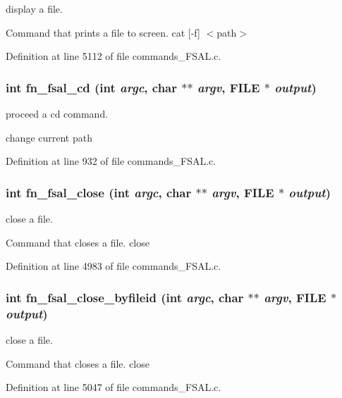 display a file.

Command that prints a file to screen. cat [-f] $<$path$>$ 

Definition at line 5112 of file commands\_\-FSAL.c.
\subsubsection[{fn\_\-fsal\_\-cd}]{\setlength{\rightskip}{0pt plus 5cm}int fn\_\-fsal\_\-cd (int {\em argc}, \/  char $\ast$$\ast$ {\em argv}, \/  FILE $\ast$ {\em output})}\label{commands_8h_1e383e905f534a477fa6002c8344114c}


proceed a cd command.

change current path 

Definition at line 932 of file commands\_\-FSAL.c.
\subsubsection[{fn\_\-fsal\_\-close}]{\setlength{\rightskip}{0pt plus 5cm}int fn\_\-fsal\_\-close (int {\em argc}, \/  char $\ast$$\ast$ {\em argv}, \/  FILE $\ast$ {\em output})}\label{commands_8h_1dfe4ba6cf12309c66972b4beb736f49}


close a file.

Command that closes a file. close 

Definition at line 4983 of file commands\_\-FSAL.c.
\subsubsection[{fn\_\-fsal\_\-close\_\-byfileid}]{\setlength{\rightskip}{0pt plus 5cm}int fn\_\-fsal\_\-close\_\-byfileid (int {\em argc}, \/  char $\ast$$\ast$ {\em argv}, \/  FILE $\ast$ {\em output})}\label{commands_8h_dd966799be6a18249b7fa33d65d49ccf}


close a file.

Command that closes a file. close 

Definition at line 5047 of file commands\_\-FSAL.c.
